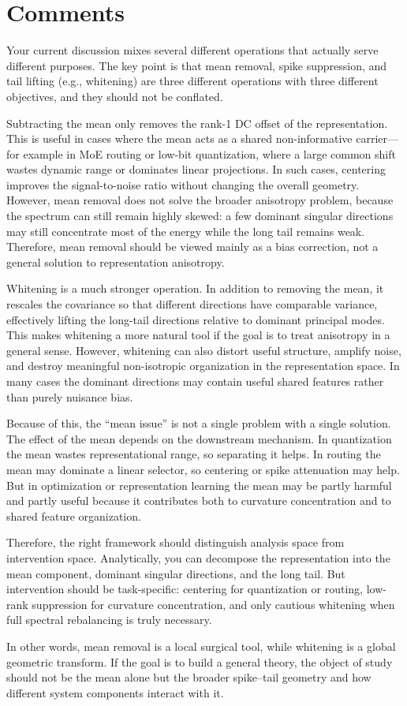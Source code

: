 \section{Comments}

Your current discussion mixes several different operations that actually serve different purposes. The key point is that mean removal, spike suppression, and tail lifting (e.g., whitening) are three different operations with three different objectives, and they should not be conflated.

Subtracting the mean only removes the rank-1 DC offset of the representation. This is useful in cases where the mean acts as a shared non-informative carrier—for example in MoE routing or low-bit quantization, where a large common shift wastes dynamic range or dominates linear projections. In such cases, centering improves the signal-to-noise ratio without changing the overall geometry. However, mean removal does not solve the broader anisotropy problem, because the spectrum can still remain highly skewed: a few dominant singular directions may still concentrate most of the energy while the long tail remains weak. Therefore, mean removal should be viewed mainly as a bias correction, not a general solution to representation anisotropy.

Whitening is a much stronger operation. In addition to removing the mean, it rescales the covariance so that different directions have comparable variance, effectively lifting the long-tail directions relative to dominant principal modes. This makes whitening a more natural tool if the goal is to treat anisotropy in a general sense. However, whitening can also distort useful structure, amplify noise, and destroy meaningful non-isotropic organization in the representation space. In many cases the dominant directions may contain useful shared features rather than purely nuisance bias.

Because of this, the “mean issue” is not a single problem with a single solution. The effect of the mean depends on the downstream mechanism. In quantization the mean wastes representational range, so separating it helps. In routing the mean may dominate a linear selector, so centering or spike attenuation may help. But in optimization or representation learning the mean may be partly harmful and partly useful because it contributes both to curvature concentration and to shared feature organization.

Therefore, the right framework should distinguish analysis space from intervention space. Analytically, you can decompose the representation into the mean component, dominant singular directions, and the long tail. But intervention should be task-specific: centering for quantization or routing, low-rank suppression for curvature concentration, and only cautious whitening when full spectral rebalancing is truly necessary.

In other words, mean removal is a local surgical tool, while whitening is a global geometric transform. If the goal is to build a general theory, the object of study should not be the mean alone but the broader spike–tail geometry and how different system components interact with it. 